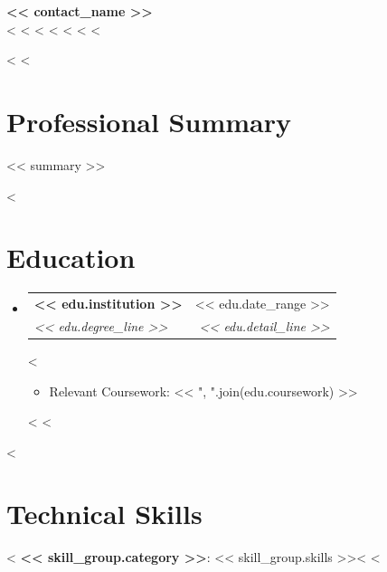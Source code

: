 \documentclass[letterpaper,11pt]{article}
\makeatletter
\newcommand{\resumeItem}[1]{
  \item\small{
    {#1 \vspace{-3pt}}
  }
}
\newcommand{\resumeSubheading}[4]{
  \vspace{-2pt}\item
    \begin{tabular*}{0.97\textwidth}[t]{l@{\extracolsep{\fill}}r}
      \textbf{#1} & {\small #2}\\
      \textit{\small#3} & \textit{\small #4}\\
    \end{tabular*}\vspace{-7pt}
}
\newcommand{\resumeSubHeadingListStart}{\begin{itemize}[leftmargin=0.15in, label={}]}
\newcommand{\resumeSubHeadingListEnd}{\end{itemize}}
\newcommand{\resumeItemListStart}{\begin{itemize}[leftmargin=0.2in]}
\newcommand{\resumeItemListEnd}{\end{itemize}\vspace{-5pt}}
\makeatother
\begin{document}
\begin{center}
    {\Huge \textbf{<< contact_name >>}} \\ \vspace{3pt}
    <%
    \small
    <%
    <%
    <%
    <%
    <%
    <%
\end{center}

<%
<%
\section{Professional Summary}
\small{<< summary >>}
\vspace{-4pt}

<%
\section{Education}
  \resumeSubHeadingListStart
    <%
    \resumeSubheading
      {<< edu.institution >>}{<< edu.date_range >>}
      {<< edu.degree_line >>}{<< edu.detail_line >>}
      <%
      \resumeItemListStart
        \resumeItem{Relevant Coursework: << ", ".join(edu.coursework) >>}
      \resumeItemListEnd
      <%
    <%
  \resumeSubHeadingListEnd

<%
\section{Technical Skills}
 \begin{itemize}[leftmargin=0.15in, label={}]
    \small{\item{
     <%
     \textbf{<< skill_group.category >>}{: << skill_group.skills >>}<%
     <%
    }}
 \end{itemize}
\end{document}
